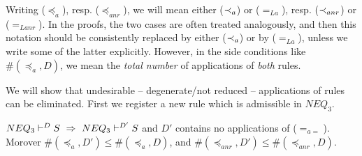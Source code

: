 \begin{REMARK}\label{re:notation}
Writing ($\preceq_a$), resp. ($\preceq_{anr}$), we will mean 
either ($\mathbin{\prec}_a$) or ($=_{La}$), resp. ($\mathbin{\prec}_{anr}$) or ($=_{Lanr}$).
In the proofs, the
 two cases are often treated analogously, and then this notation should be
 consistently replaced by either ($\mathbin{\prec}_a$) or by ($=_{La}$), unless we
 write some of the latter explicitly. 
However, in the side conditions like $\#(\preceq_a,D)$, we mean the {\em total number}
of applications of {\em both} rules.
\end{REMARK}
\noindent
We will show that undesirable -- degenerate/not reduced -- applications of rules
can be eliminated.
First we register a new rule which is admissible in $NEQ_3$.
%
\begin{LEMMA}\label{le:noeqeq}
 ${NEQ_3}\vdash^{{D}}S\ \mathrel\Rightarrow\ {NEQ_3}\vdash^{{D'}}S$ and $D'$ contains no applications
 of ($=_{a=}$). Morover $\#(\preceq_a,D')\leq \#(\preceq_a,D)$,
and $\#(\preceq_{anr},D')\leq \#(\preceq_{anr},D)$.
\end{LEMMA}
